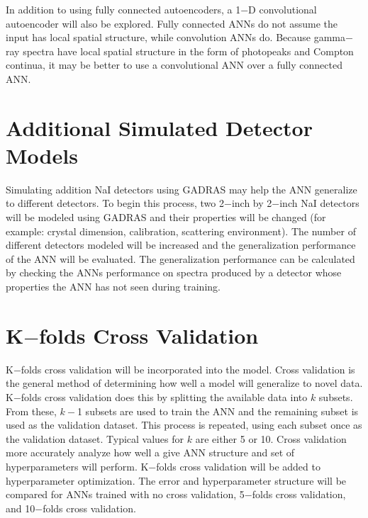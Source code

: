 \documentclass[tocnosub,noragright,centerchapter,12pt,fullpage]{uiucecethesis09}
\begin{document}
In addition to using fully connected autoencoders, a 1$-$D convolutional autoencoder will also be explored. Fully connected ANNs do not assume the input has local spatial structure, while convolution ANNs do. Because gamma$-$ray spectra have local spatial structure in the form of photopeaks and Compton continua, it may be better to use a convolutional ANN over a fully connected ANN.



\section{Additional Simulated Detector Models}

Simulating addition NaI detectors using GADRAS may help the ANN generalize to different detectors. To begin this process, two 2$-$inch by 2$-$inch NaI detectors will be modeled using GADRAS and their properties will be changed (for example: crystal dimension, calibration, scattering environment). The number of different detectors modeled will be increased and the generalization performance of the ANN will be evaluated. The generalization performance can be calculated by checking the ANNs performance on spectra produced by a detector whose properties the ANN has not seen during training.  



\section{K$-$folds Cross Validation}
K$-$folds cross validation will be incorporated into the model. Cross validation is the general method of determining how well a model will generalize to novel data. K$-$folds cross validation does this by splitting the available data into $k$ subsets. From these, $k-$1 subsets are used to train the ANN and the remaining subset is used as the validation dataset. This process is repeated, using each subset once as the validation dataset. Typical values for $k$ are either 5 or 10. Cross validation more accurately analyze how well a give ANN structure and set of hyperparameters will perform. K$-$folds cross validation will be added to hyperparameter optimization. The error and hyperparameter structure will be compared for ANNs trained with no cross validation, 5$-$folds cross validation, and 10$-$folds cross validation.
\end{document}
